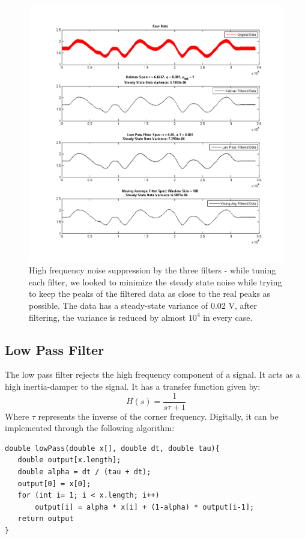 \documentclass{article}
\theoremstyle{plain}
\theoremstyle{definition}
\theoremstyle{remark}
\begin{document}
\begin{figure}[hbt]
\begin{center}
\includegraphics[width = 16cm]{ss_noise_filtering.png}
\caption{High frequency noise suppression by the three filters - while tuning each filter, we looked to minimize the steady state noise while trying to keep the peaks of the filtered data as close to the real peaks as possible. The data has a steady-state variance of 0.02 V, after filtering, the variance is reduced by almost $10^4$  in every case.}
\label{ss_noise_filtering}
\end{center}
\end{figure}

\clearpage

\subsection{Low Pass Filter}
The low pass filter rejects the high frequency component of a signal. It acts as a high inertia-damper to the signal. It has a transfer function given by: 
$$H(s) = \frac{1}{s\tau + 1}$$
Where $\tau$ represents the inverse of the corner frequency. Digitally, it can be implemented through the following algorithm:
\begin{verbatim}
double lowPass(double x[], double dt, double tau){
   double output[x.length];
   double alpha = dt / (tau + dt);
   output[0] = x[0];
   for (int i= 1; i < x.length; i++)
       output[i] = alpha * x[i] + (1-alpha) * output[i-1];
   return output
}
\end{verbatim}
\end{document}
